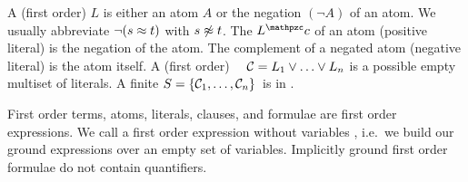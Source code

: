 
\begin{definition}\label{def:literals}\label{def:syntax:CNF}
A (first order)  \( L \) is either an atom \( A \) or the negation
\( (\lnot A) \) of an atom. We usually abbreviate \( \lnot(s\approx t) \) with \( s\not\approx t \).
%
The  \( L^\mcc \) of an atom (positive literal) is the negation of the atom.
The complement of a negated atom (negative literal) is the atom itself.
A (first order) \ \ \( \mathcal{C} = L_1\lor\ldots\lor L_n \)  is a possible empty multiset of literals.
A finite  \( S=\{ \mathcal{C}_1,\ldots,\mathcal{C}_n \} \) is in .
\end{definition}

\begin{remark}
	First order terms, atoms, literals, clauses, and formulae are first order expressions.
	We call a first order expression without variables ,
	i.e.~we build our ground expressions over an empty set of variables.
	Implicitly ground first order formulae do not contain quantifiers.
\end{remark}



